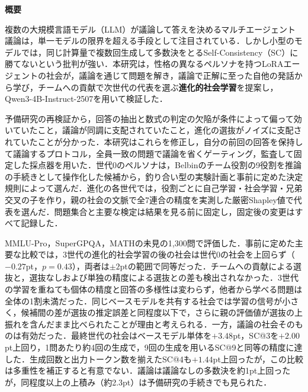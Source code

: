 \clearpage
\begin{center}\thispagestyle{empty}
{\LARGE\bfseries{概要}}
\end{center}

複数の大規模言語モデル（LLM）が議論して答えを決めるマルチエージェント議論は，単一モデルの限界を超える手段として注目されている．しかし小型のモデルでは，同じ計算量で複数回生成して多数決をとるSelf-Consistency（SC）に勝てないという批判が強い．本研究は，性格の異なるペルソナを持つLoRAエージェントの社会が，議論を通じて問題を解き，議論で正解に至った自他の発話から学び，チームへの貢献で次世代の代表を選ぶ\textbf{進化的社会学習}を提案し，Qwen3-4B-Instruct-2507を用いて検証した．

予備研究の再検証から，回答の抽出と数式の判定の欠陥が条件によって偏って効いていたこと，議論が同調に支配されていたこと，進化の選抜がノイズに支配されていたことが分かった．本研究はこれらを修正し，自分の前回の回答を保持して議論するプロトコル，全員一致の問題で議論を省くゲーティング，監査して固定した採点器を用いた．世代0のペルソナは，Belbinのチーム役割の9役割を推論の手続きとして操作化した候補から，釣り合い型の実験計画と事前に定めた決定規則によって選んだ．進化の各世代では，役割ごとに自己学習・社会学習・兄弟交叉の子を作り，親の社会の文脈で全7連合の精度を実測した厳密Shapley値で代表を選んだ．問題集合と主要な検定は結果を見る前に固定し，固定後の変更はすべて記録した．

MMLU-Pro，SuperGPQA，MATHの未見の1,300問で評価した．事前に定めた主要な比較では，3世代の進化的社会学習の後の社会は世代0の社会を上回らず（$-0.27$pt，$p = 0.43$），両者は$\pm 2$ptの範囲で同等だった．チームへの貢献による選抜と，選抜なしおよび単独の精度による選抜との差も検出されなかった．3世代の学習を重ねても個体の精度と回答の多様性は変わらず，他者から学べる問題は全体の1割未満だった．同じベースモデルを共有する社会では学習の信号が小さく，候補間の差が選抜の推定誤差と同程度以下で，さらに親の評価値が選抜の上振れを含んだまま比べられたことが理由と考えられる．一方，議論の社会そのものは有効だった．最終世代の社会はベースモデル単体を$+3.48$pt，SC@3を$+2.00$pt上回り，1問あたり約4回の生成で，9回の生成を用いるSC@9と同等の精度に達した．生成回数と出力トークン数を揃えたSC@4も$+1.44$pt上回ったが，この比較は多重性を補正すると有意でない．議論は議論なしの多数決を約1pt上回ったが，同程度以上の上積み（約2.3pt）は予備研究の手続きでも見られた．

\clearpage
\phantom{s}\thispagestyle{empty}
\clearpage

\pagestyle{empty}
